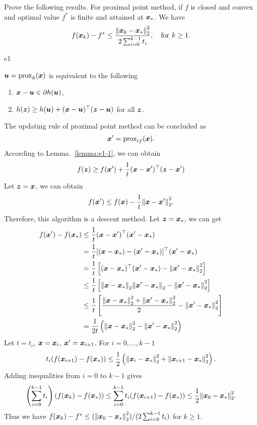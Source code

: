 \begin{excercise}\label{e1}
    Prove the following results.
    For proximal point method, if $f$ is closed and convex and optimal value $f^*$ is finite and attained at $\bm{x}_*$. We have
    \[
    f(\bm{x}_k) - f^* \leq \frac{ \norm{\bm{x}_0 - \bm{x}_*}^2_2 }{ 2 \sum_{i=0}^{k-1} t_i}, \quad\textrm{for } k \geq 1.
    \]
\end{excercise}
    
\begin{PROOF}{e1}
    \begin{lemma}\label{lemma:e1-1}
        \(\bm{u} = \mathrm{prox}_h(\bm{x})\) is equivalent to the following 
        \begin{enumerate}
            \item \(\bm{x} - \bm{u} \in \partial h(\bm{u})\),
            \item \(h(\bm{z}) \ge h(\bm{u}) + (\bm{x} - \bm{u})^\top (\bm{z} - \bm{u})\) for all \(\bm{z}\).
        \end{enumerate}
    \end{lemma}

    The updating rule of proximal point method can be concluded as 
    \[
        \bm{x}' = \mathrm{prox}_{tf}(\bm{x}).
    \]
    According to Lemma.~\ref{lemma:e1-1}, we can obtain
    \[
        f(\bm{z}) \ge f(\bm{x}') + \frac{1}{t}(\bm{x} - \bm{x}')^\top (\bm{z} - \bm{x}')
    \]
    Let \(\bm{z} = \bm{x}\), we can obtain
    \[
        f(\bm{x}') \le f(\bm{x}) - \frac{1}{t}\norm{\bm{x} - \bm{x}'}^2_2.  
    \]
    Therefore, this algorithm is a descent method. Let \(\bm{z} = \bm{x}_*\), we can get
    \[
        \begin{aligned}
            f(\bm{x}') - f(\bm{x}_*) &\le \frac{1}{t} (\bm{x} - \bm{x}')^\top(\bm{x}' - \bm{x}_*) \\
            &= \frac{1}{t} [(\bm{x} - \bm{x}_*) - (\bm{x}' - \bm{x}_*)]^\top (\bm{x}' - \bm{x}_*) \\
            &= \frac{1}{t} \left[ (\bm{x} - \bm{x}_*)^\top(\bm{x}' - \bm{x}_*) - \norm{\bm{x}' - \bm{x}_*}_2^2 \right]\\
            &\le \frac{1}{t} \left[\norm{\bm{x} - \bm{x}_*}_2\norm{\bm{x}' - \bm{x}_*}_2 - \norm{\bm{x}' - \bm{x}_*}_2^2 \right]\\
            &\le \frac{1}{t} \left[\frac{\norm{\bm{x} - \bm{x}_*}_2^2 + \norm{\bm{x}' - \bm{x}_*}_2^2}{2} - \norm{\bm{x}' - \bm{x}_*}_2^2 \right]\\
            &= \frac{1}{2t}\left(\norm{\bm{x} - \bm{x}_*}_2^2 - \norm{\bm{x}' - \bm{x}_*}_2^2  \right)
        \end{aligned}
    \]
    Let \(t = t_i\), \(\bm{x} = \bm{x}_i\), \(\bm{x}' = \bm{x}_{i+1}\). For \(i = 0, \dots, k-1\)
    \[
        t_i (f(\bm{x}_{i+1}) - f(\bm{x}_*)) \le \frac{1}{2} \left( 
            \norm{\bm{x}_i - \bm{x}_*}_2^2 + \norm{\bm{x}_{i+1} - \bm{x}_*}_2^2
        \right).
    \]
    Adding inequalities from \(i = 0\) to \(k-1\) gives
    \[
        \left( \sum_{i=0}^{k-1} t_i \right) (f(\bm{x}_k) - f(\bm{x}_*)) \le
        \sum_{i=0}^{k-1} t_i (f(\bm{x}_{i+1}) - f(\bm{x}_*)) \le \frac{1}{2} \norm{\bm{x}_0 - \bm{x}_*}_2^2.
    \]
    Thus we have \(f(\bm{x}_k) - f^* \leq ( \norm{\bm{x}_0 - \bm{x}_*}^2_2 ) /{ (2 \sum_{i=0}^{k-1} t_i})\) for \(k \ge 1\).
\end{PROOF}